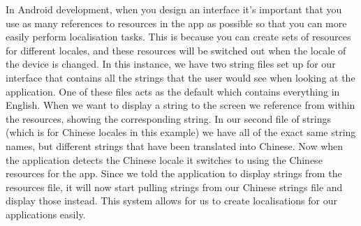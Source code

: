 \documentclass{scrartcl}
\begin{document}
In Android development, when you design an interface it's important that you use as many references
to resources in the app as possible so that you can more easily perform localisation tasks. This is
because you can create sets of resources for different locales, and these resources will be switched
out when the locale of the device is changed. In this instance, we have two string files set up for
our interface that contains all the strings that the user would see when looking at the application.
One of these files acts as the default which contains everything in English. When we want to display
a string to the screen we reference from within the resources, showing the corresponding string.
In our second file of strings (which is for Chinese locales in this example) we have all of the exact
same string names, but different strings that have been translated into Chinese. Now when the
application detects the Chinese locale it switches to using the Chinese resources for the app. Since
we told the application to display strings from the resources file, it will now start pulling strings
from our Chinese strings file and display those instead. This system allows for us to create localisations
for our applications easily.
\end{document}
